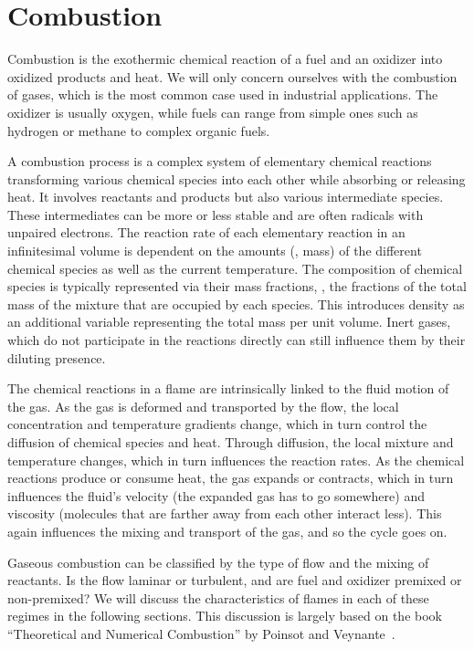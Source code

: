 \section{Combustion} %
\label{sec:combustion}
%
Combustion is the exothermic chemical reaction of a fuel and an oxidizer into
oxidized products and heat.
%
We will only concern ourselves with the combustion of gases, which is the
most common case used in industrial applications.
%
The oxidizer is usually oxygen, while fuels can range from simple ones such as
hydrogen or methane to complex organic fuels.
%

%
A combustion process is a complex system of elementary chemical reactions
transforming various chemical species into each other while absorbing or
releasing heat.
%
It involves reactants and products but also various intermediate species.
%
These intermediates can be more or less stable and are often radicals with
unpaired electrons.
%
The reaction rate of each elementary reaction in an infinitesimal volume is
dependent on the amounts (\ie{}, mass) of the different chemical species as well
as the current temperature.
%
The composition of chemical species is typically represented via their mass
fractions, \ie{}, the fractions of the total mass of the mixture that are
occupied by each species.
%
This introduces density as an additional variable representing the total mass
per unit volume.
%
Inert gases, which do not participate in the reactions directly can still
influence them by their diluting presence.
%

%
The chemical reactions in a flame are intrinsically linked to the fluid motion
of the gas.
%
As the gas is deformed and transported by the flow, the local concentration and
temperature gradients change, which in turn control the diffusion of chemical
species and heat.
%
Through diffusion, the local mixture and temperature changes, which in turn
influences the reaction rates.
%
As the chemical reactions produce or consume heat, the gas expands or contracts,
which in turn influences the fluid's velocity (the expanded gas has to go
somewhere) and viscosity (molecules that are farther away from each other
interact less).
%
This again influences the mixing and transport of the gas, and so the cycle goes
on.
%

%
Gaseous combustion can be classified by the type of flow and the mixing of
reactants.
%
Is the flow laminar or turbulent, and are fuel and oxidizer premixed or
non-premixed?
%
We will discuss the characteristics of flames in each of these regimes in the
following sections.
%
This discussion is largely based on the book ``Theoretical and Numerical
Combustion'' by Poinsot and Veynante~\cite{Poinsot2012}.
%
